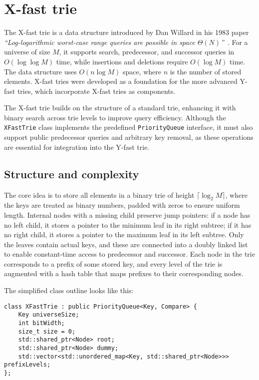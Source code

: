 \section{X-fast trie}
The X-fast trie is a data structure introduced by Dan Willard in his 1983 paper \emph{``Log-logarithmic worst-case range queries are possible in space \( \Theta(N) \)''}~\cite{Willard1983}. For a universe of size \( M \), it supports search, predecessor, and successor queries in \( O(\log \log M) \) time, while insertions and deletions require \( O(\log M) \) time. The data structure uses \( O(n \log M) \) space, where \( n \) is the number of stored elements. X-fast tries were developed as a foundation for  the more advanced Y-fast tries, which incorporate X-fast tries as components.

The X-fast trie builds on the structure of a standard trie, enhancing it with binary search across trie levels to improve query efficiency. Although the \texttt{XFastTrie} class implements the predefined \texttt{PriorityQueue} interface, it must also support public predecessor queries and arbitrary key removal, as these operations are essential for integration into the Y-fast trie.

\subsection{Structure and complexity}
The core idea is to store all elements in a binary trie of height \( \lceil \log_2 M \rceil \), where the keys are treated as binary numbers, padded with zeros to ensure uniform length. Internal nodes with a missing child preserve jump pointers: if a node has no left child, it stores a pointer to the minimum leaf in its right subtree; if it has no right child, it stores a pointer to the maximum leaf in its left subtree. Only the leaves contain actual keys, and these are connected into a doubly linked list to enable constant-time access to predecessor and successor. Each node in the trie corresponds to a prefix of some stored key, and every level of the trie is augmented with a hash table that maps prefixes to their corresponding nodes.

The simplified class outline looks like this:
\begin{verbatim}
class XFastTrie : public PriorityQueue<Key, Compare> {
    Key universeSize;
    int bitWidth;
    size_t size = 0;
    std::shared_ptr<Node> root;
    std::shared_ptr<Node> dummy;
    std::vector<std::unordered_map<Key, std::shared_ptr<Node>>> prefixLevels;
};
\end{verbatim}


